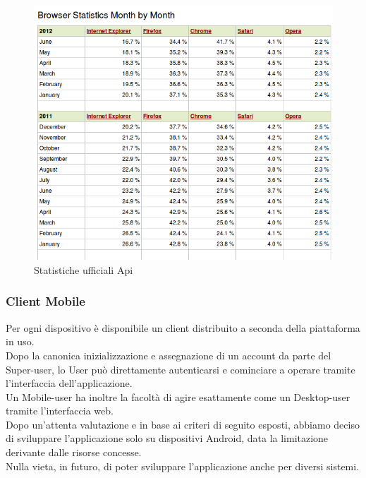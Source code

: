 \documentclass[10pt,a4paper]{article}
\begin{document}
\begin{figure}[H]
\centering
\caption{Statistiche ufficiali Api}
\includegraphics[scale=0.55]{images/internetStat} 
\end{figure}


\subsubsection{Client Mobile}
Per ogni dispositivo è disponibile un client distribuito a seconda della piattaforma in uso.\\
Dopo la canonica inizializzazione e assegnazione di un account da parte del Super-user, lo User può direttamente autenticarsi e cominciare a operare tramite l’interfaccia dell’applicazione.\\ 
Un Mobile-user ha inoltre la facoltà di agire esattamente come un Desktop-user tramite l’interfaccia web.\\
Dopo un'attenta valutazione e in base ai criteri di seguito esposti, abbiamo deciso di sviluppare l'applicazione solo su dispositivi Android, data la limitazione derivante dalle risorse concesse.\\
Nulla vieta, in futuro, di poter sviluppare l'applicazione anche per diversi sistemi.
\end{document}
